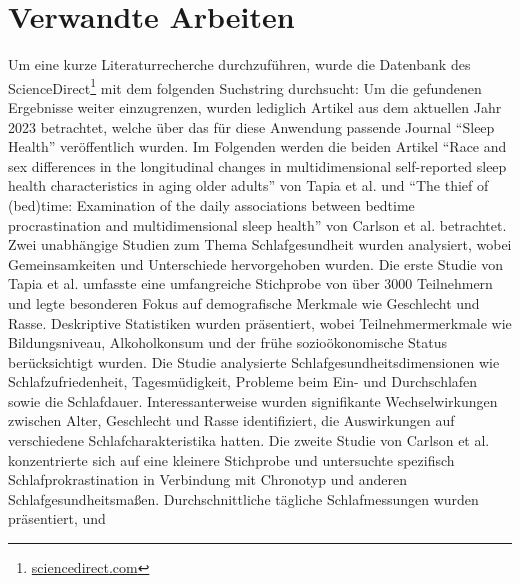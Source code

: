 \documentclass[usegeometry=true]{scrartcl}
\begin{document}
\section{Verwandte Arbeiten}
Um eine kurze Literaturrecherche durchzuführen, wurde die Datenbank des ScienceDirect\footnote{\url{sciencedirect.com}} mit dem folgenden Suchstring durchsucht: \newline
{   
    \centering
}
\newline
Um die gefundenen Ergebnisse weiter einzugrenzen, wurden lediglich Artikel aus dem aktuellen Jahr 2023 betrachtet, 
welche über das für diese Anwendung passende Journal \enquote{Sleep Health} veröffentlich wurden. Im Folgenden werden die beiden Artikel \enquote{Race and sex differences in the longitudinal changes in multidimensional self-reported sleep health characteristics in aging older adults} von Tapia et al.\cite{Tapia2023} und \enquote{The thief of (bed)time: Examination of the daily associations between bedtime procrastination and multidimensional sleep health} von Carlson et al.\cite{Carlson2023} betrachtet.
\newline
Zwei unabhängige Studien zum Thema Schlafgesundheit wurden analysiert, wobei Gemeinsamkeiten und Unterschiede hervorgehoben wurden.
 Die erste Studie von Tapia et al. umfasste eine umfangreiche Stichprobe von über 3000 Teilnehmern und legte besonderen Fokus auf
  demografische Merkmale wie Geschlecht und Rasse. Deskriptive Statistiken wurden präsentiert, wobei Teilnehmermerkmale wie Bildungsniveau,
   Alkoholkonsum und der frühe sozioökonomische Status berücksichtigt wurden. Die Studie analysierte Schlafgesundheitsdimensionen wie Schlafzufriedenheit, 
   Tagesmüdigkeit, Probleme beim Ein- und Durchschlafen sowie die Schlafdauer. Interessanterweise wurden signifikante Wechselwirkungen zwischen Alter, Geschlecht und Rasse identifiziert, die Auswirkungen auf verschiedene Schlafcharakteristika hatten.
\newline
Die zweite Studie von Carlson et al. konzentrierte sich auf eine kleinere Stichprobe und untersuchte spezifisch 
Schlafprokrastination in Verbindung mit Chronotyp und anderen Schlafgesundheitsmaßen.
 Durchschnittliche tägliche Schlafmessungen wurden präsentiert, und 
\end{document}
